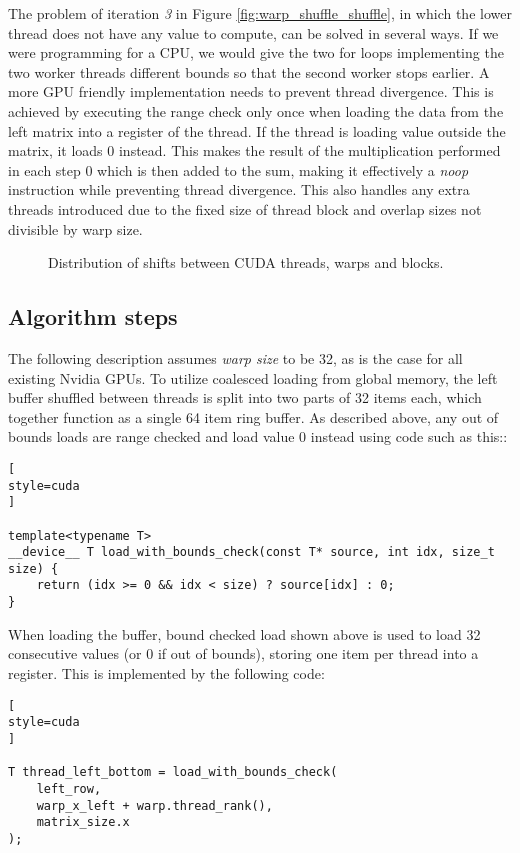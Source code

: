 The problem of iteration \textit{3} in Figure \ref{fig:warp_shuffle_shuffle}, in which the lower thread does not have any value to compute, can be solved in several ways. If we were programming for a CPU, we would give the two for loops implementing the two worker threads different bounds so that the second worker stops earlier. A more GPU friendly implementation needs to prevent thread divergence. This is achieved by executing the range check only once when loading the data from the left matrix into a register of the thread. If the thread is loading value outside the matrix, it loads 0 instead. This makes the result of the multiplication performed in each step 0 which is then added to the sum, making it effectively a \textit{noop} instruction while preventing thread divergence. This also handles any extra threads introduced due to the fixed size of thread block and overlap sizes not divisible by warp size.

\begin{figure}[ht]
	\centering
	\def\svgwidth{0.8\textwidth}
	
	\caption{Distribution of shifts between CUDA threads, warps and blocks.}
	\label{fig:warp_shuffle_simple_dist}
\end{figure}

\subsection{Algorithm steps}

The following description assumes \textit{warp size} to be 32, as is the case for all existing Nvidia GPUs. To utilize coalesced loading from global memory, the left buffer shuffled between threads is split into two parts of 32 items each, which together function as a single 64 item ring buffer. As described above, any out of bounds loads are range checked and load value 0 instead using code such as this::
\begin{lstlisting}[
style=cuda
]

template<typename T>
__device__ T load_with_bounds_check(const T* source, int idx, size_t size) {
	return (idx >= 0 && idx < size) ? source[idx] : 0;
}
\end{lstlisting}


When loading the buffer, bound checked load shown above is used to load 32 consecutive values (or 0 if out of bounds), storing one item per thread into a register. This is implemented by the following code:
\begin{lstlisting}[
style=cuda
]

T thread_left_bottom = load_with_bounds_check(
	left_row,
	warp_x_left + warp.thread_rank(),
	matrix_size.x
);

\end{lstlisting}

